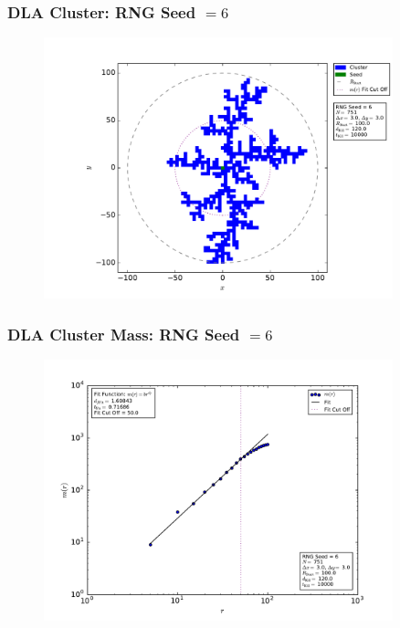 \documentclass[mathserif,18pt,xcolor=table]{beamer}
\begin{document}

\begin{frame}
  \frametitle{DLA Cluster: RNG Seed $= 6$}
\begin{figure}
  \centering
  \includegraphics[width=0.9\textwidth]{problem_3/large_cluster_seed_num_6.pdf}
\end{figure}
\end{frame}

\begin{frame}
  \frametitle{DLA Cluster Mass: RNG Seed $= 6$}
\begin{figure}
  \centering
  \includegraphics[width=0.9\textwidth]{problem_3/large_cluster_mass_seed_num_6.pdf}
\end{figure}
\end{frame}
\end{document}
